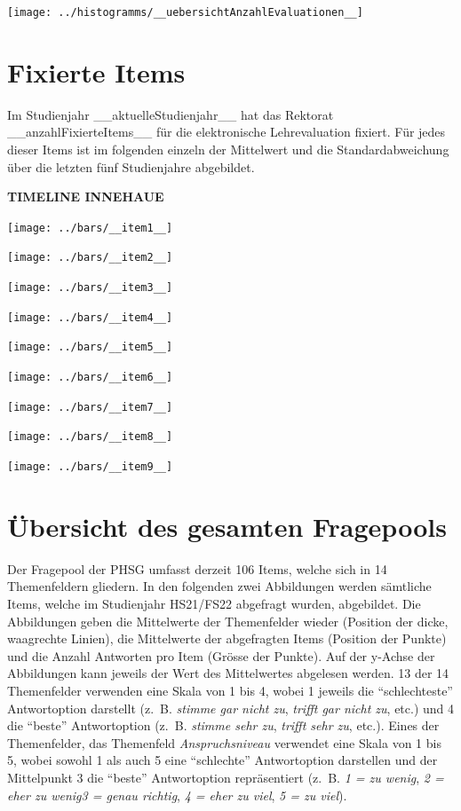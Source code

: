 \documentclass[11pt]{article}
\begin{document}
\texttt{[image: ../histogramms/\_\_uebersichtAnzahlEvaluationen\_\_]}

\newpage
\section{Fixierte Items}
\label{sec: fixierteItems}
Im Studienjahr __aktuelleStudienjahr__ hat das Rektorat __anzahlFixierteItems__ für die elektronische Lehrevaluation fixiert. Für jedes dieser Items ist im folgenden einzeln der Mittelwert und die Standardabweichung über die letzten fünf Studienjahre abgebildet.

\textbf{TIMELINE INNEHAUE}
\bigskip

\texttt{[image: ../bars/\_\_item1\_\_]}

\texttt{[image: ../bars/\_\_item2\_\_]}

\texttt{[image: ../bars/\_\_item3\_\_]}

\texttt{[image: ../bars/\_\_item4\_\_]}

\texttt{[image: ../bars/\_\_item5\_\_]}

\texttt{[image: ../bars/\_\_item6\_\_]}

\texttt{[image: ../bars/\_\_item7\_\_]}

\texttt{[image: ../bars/\_\_item8\_\_]}

\texttt{[image: ../bars/\_\_item9\_\_]}




\newpage
\section{Übersicht des gesamten Fragepools}
\label{sec: fragepool}
Der Fragepool der PHSG umfasst derzeit 106 Items, welche sich in 14 Themenfeldern gliedern. In den folgenden zwei Abbildungen werden sämtliche Items, welche im Studienjahr HS21/FS22 abgefragt wurden, abgebildet. Die Abbildungen geben die Mittelwerte der Themenfelder wieder (Position der dicke, waagrechte Linien), die Mittelwerte der abgefragten Items (Position der Punkte) und die Anzahl Antworten pro Item (Grösse der Punkte). Auf der y-Achse der Abbildungen kann jeweils der Wert des Mittelwertes abgelesen werden. 13 der 14 Themenfelder verwenden eine Skala von 1 bis 4, wobei 1 jeweils die "`schlechteste"' Antwortoption darstellt (z. B. \textit{stimme gar nicht zu}, \textit{trifft gar nicht zu}, etc.) und 4 die "`beste"' Antwortoption (z. B. \textit{stimme sehr zu}, \textit{trifft sehr zu}, etc.). Eines der Themenfelder, das Themenfeld \textit{Anspruchsniveau} verwendet eine Skala von 1 bis 5, wobei sowohl 1 als auch 5 eine "`schlechte"' Antwortoption darstellen und der Mittelpunkt 3 die "`beste"' Antwortoption repräsentiert (z. B. \textit{1 = zu wenig}, \textit{2 = eher zu wenig}\textit{3 = genau richtig}, \textit{4 = eher zu viel}, \textit{5 = zu viel}). \\
\end{document}
